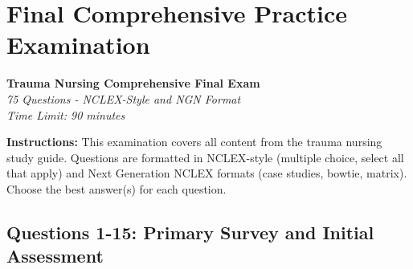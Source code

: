 \documentclass[11pt]{article}
\begin{document}
\newpage
\section{Final Comprehensive Practice Examination}

\begin{center}
\textbf{\Large Trauma Nursing Comprehensive Final Exam}\\
\vspace{0.3cm}
\textit{75 Questions - NCLEX-Style and NGN Format}\\
\textit{Time Limit: 90 minutes}
\end{center}

\vspace{0.5cm}

\textbf{Instructions:} This examination covers all content from the trauma nursing study guide. Questions are formatted in NCLEX-style (multiple choice, select all that apply) and Next Generation NCLEX formats (case studies, bowtie, matrix). Choose the best answer(s) for each question.

\vspace{0.5cm}

\subsection*{Questions 1-15: Primary Survey and Initial Assessment}
\end{document}
